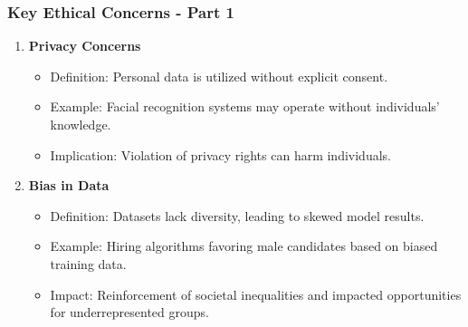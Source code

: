 \documentclass[aspectratio=169]{beamer}
\begin{document}
\begin{frame}[fragile]
    \frametitle{Key Ethical Concerns - Part 1}
    \begin{enumerate}
        \item \textbf{Privacy Concerns}
            \begin{itemize}
                \item Definition: Personal data is utilized without explicit consent.
                \item Example: Facial recognition systems may operate without individuals' knowledge.
                \item Implication: Violation of privacy rights can harm individuals.
            \end{itemize}

        \item \textbf{Bias in Data}
            \begin{itemize}
                \item Definition: Datasets lack diversity, leading to skewed model results.
                \item Example: Hiring algorithms favoring male candidates based on biased training data.
                \item Impact: Reinforcement of societal inequalities and impacted opportunities for underrepresented groups.
            \end{itemize}
    \end{enumerate}
\end{frame}
\end{document}
